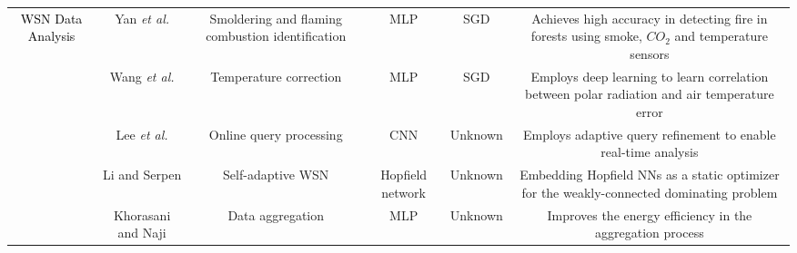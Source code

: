 \documentclass[journal,comsoc,letter]{IEEEtran}
\newcommand{\rev}[1]{\textcolor{black}{#1}}
\begin{document}
\begin{table*}[h!]
\begin{tabular}{|c|C{2CM}|C{3CM}|C{1.5CM}|C{2CM}|C{3.8CM}|}
\multirow{7}{*}{\rev{WSN Data Analysis}}              & Yan \emph{et al.} \cite{yan2016real}                         & Smoldering and flaming combustion identification                                                       & MLP                                          & SGD                                                           & Achieves high accuracy in detecting fire in forests using smoke, $CO_2$ and temperature sensors                                                     \\  
                                                     & Wang \emph{et al.} \cite{wang2017temperature}                & Temperature correction                                                                                 & MLP                                          & SGD                                                           & Employs deep learning to learn correlation between polar radiation and air temperature error                                                        \\  
                                                     & Lee \emph{et al.} \cite{lee2017deep222}                      & Online query processing                                                                                & CNN                                          & Unknown                                                       & Employs adaptive query refinement to enable real-time analysis                                                                                      \\  
                                                     & Li and Serpen \cite{li2016adaptive}                          & Self-adaptive WSN                                                                                      & Hopfield network                             & Unknown                                                       & Embedding Hopfield NNs as a static optimizer for the weakly-connected dominating problem                                                            \\  
                                                     & Khorasani and Naji \cite{khorasani2017energy}                & Data aggregation                                                                                       & MLP                                          & Unknown                                                       & Improves the energy efficiency in the aggregation process                                                                                           \\  

\end{tabular}
\end{table*}
\end{document}
